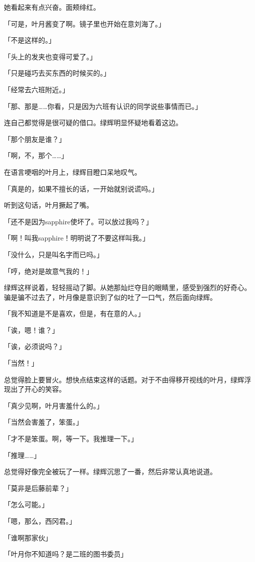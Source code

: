 \documentclass[UTF8]{ctexart}
\begin{document}
    她看起来有点兴奋。面颊绯红。

    「可是，叶月酱变了啊。镜子里也开始在意刘海了。」

    「不是这样的。」

    「头上的发夹也变得可爱了。」

    「只是碰巧去买东西的时候买的。」

    「经常去六班附近。」

    「那、那是……你看，只是因为六班有认识的同学说些事情而已。」

    连自己都觉得是很可疑的借口。绿辉明显怀疑地看着这边。

    「那个朋友是谁？」

    「啊，不，那个……」

    在语言哽咽的叶月上，绿辉目瞪口呆地叹气。

    「真是的，如果不擅长的话，一开始就别说谎吗。」

    听到这句话，叶月撅起了嘴。

    「还不是因为sapphire使坏了。可以放过我吗？」

    「啊！叫我sapphire！明明说了不要这样叫我。」

    「没什么，只是叫名字而已吗。」

    「哼，绝对是故意气我的！」

    绿辉这样说着，轻轻摇动了脚。从她那灿烂夺目的眼睛里，感受到强烈的好奇心。骗是骗不过去了，叶月像是意识到了似的吐了一口气，然后面向绿辉。

    「我不知道是不是喜欢，但是，有在意的人。」

    「诶，嗯！谁？」

    「诶，必须说吗？」

    「当然！」

    总觉得脸上要冒火。想快点结束这样的话题。对于不由得移开视线的叶月，绿辉浮现出了开心的笑容。

    「真少见啊，叶月害羞什么的。」

    「当然会害羞了，笨蛋。」

    「才不是笨蛋。啊，等一下。我推理一下。」

    「推理……」

    总觉得好像完全被玩了一样。绿辉沉思了一番，然后非常认真地说道。

    「莫非是后藤前辈？」

    「怎么可能。」

    「嗯，那么，西冈君。」

    「谁啊那家伙」

    「叶月你不知道吗？是二班的图书委员」
\end{document}
